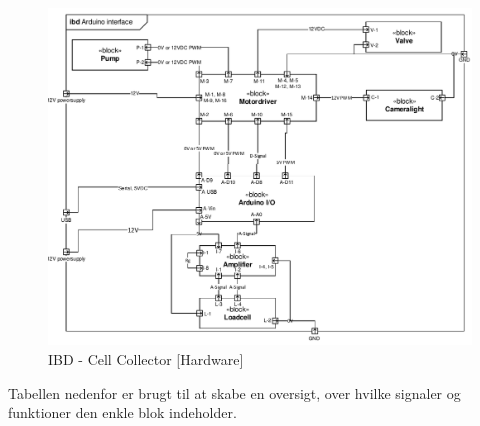 \begin{figure}[H]
	\centering
	\includegraphics[width=1\textwidth]{pdf/IBD_Hardware(Arduino).pdf}
	\caption{IBD - Cell Collector [Hardware]}
	\label{fig:ibd_Hardware}
\end{figure}

\newpage
Tabellen nedenfor er brugt til at skabe en oversigt, over hvilke signaler og funktioner den enkle blok indeholder.

